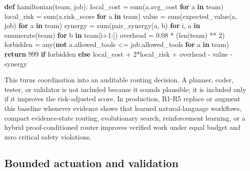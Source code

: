 \documentclass[11pt]{article}
\newenvironment{Shaded}{}{}
\newcommand{\BuiltInTok}[1]{\textcolor[rgb]{0.00,0.50,0.00}{#1}}
\newcommand{\ControlFlowTok}[1]{\textcolor[rgb]{0.00,0.44,0.13}{\textbf{#1}}}
\newcommand{\DecValTok}[1]{\textcolor[rgb]{0.25,0.63,0.44}{#1}}
\newcommand{\FloatTok}[1]{\textcolor[rgb]{0.25,0.63,0.44}{#1}}
\newcommand{\KeywordTok}[1]{\textcolor[rgb]{0.00,0.44,0.13}{\textbf{#1}}}
\newcommand{\NormalTok}[1]{#1}
\newcommand{\OperatorTok}[1]{\textcolor[rgb]{0.40,0.40,0.40}{#1}}
\begin{document}
\begin{Shaded}
\begin{Highlighting}[]
\KeywordTok{def}\NormalTok{ hamiltonian(team, job):}
\NormalTok{    local\_cost }\OperatorTok{=} \BuiltInTok{sum}\NormalTok{(a.avg\_cost }\ControlFlowTok{for}\NormalTok{ a }\KeywordTok{in}\NormalTok{ team)}
\NormalTok{    local\_risk }\OperatorTok{=} \BuiltInTok{sum}\NormalTok{(a.risk\_score }\ControlFlowTok{for}\NormalTok{ a }\KeywordTok{in}\NormalTok{ team)}
\NormalTok{    value }\OperatorTok{=} \BuiltInTok{sum}\NormalTok{(expected\_value(a, job) }\ControlFlowTok{for}\NormalTok{ a }\KeywordTok{in}\NormalTok{ team)}
\NormalTok{    synergy }\OperatorTok{=} \BuiltInTok{sum}\NormalTok{(pair\_synergy(a, b) }\ControlFlowTok{for}\NormalTok{ i, a }\KeywordTok{in} \BuiltInTok{enumerate}\NormalTok{(team) }\ControlFlowTok{for}\NormalTok{ b }\KeywordTok{in}\NormalTok{ team[i}\OperatorTok{+}\DecValTok{1}\NormalTok{:])}
\NormalTok{    overhead }\OperatorTok{=} \FloatTok{0.08} \OperatorTok{*}\NormalTok{ (}\BuiltInTok{len}\NormalTok{(team) }\OperatorTok{**} \DecValTok{2}\NormalTok{)}
\NormalTok{    forbidden }\OperatorTok{=} \BuiltInTok{any}\NormalTok{(}\KeywordTok{not}\NormalTok{ a.allowed\_tools }\OperatorTok{\textless{}=}\NormalTok{ job.allowed\_tools }\ControlFlowTok{for}\NormalTok{ a }\KeywordTok{in}\NormalTok{ team)}
    \ControlFlowTok{return} \DecValTok{999} \ControlFlowTok{if}\NormalTok{ forbidden }\ControlFlowTok{else}\NormalTok{ local\_cost }\OperatorTok{+} \DecValTok{2}\OperatorTok{*}\NormalTok{local\_risk }\OperatorTok{+}\NormalTok{ overhead }\OperatorTok{{-}}\NormalTok{ value }\OperatorTok{{-}}\NormalTok{ synergy}
\end{Highlighting}
\end{Shaded}

This turns coordination into an auditable routing decision. A planner, coder, tester, or validator is not included because it sounds plausible; it is included only if it improves the risk-adjusted score. In production, R1-R5 replace or augment this baseline whenever evidence shows that learned natural-language workflows, compact evidence-state routing, evolutionary search, reinforcement learning, or a hybrid proof-conditioned router improves verified work under equal budget and zero critical safety violations.

\subsection{Bounded actuation and validation}\label{bounded-actuation-and-validation}
\end{document}
